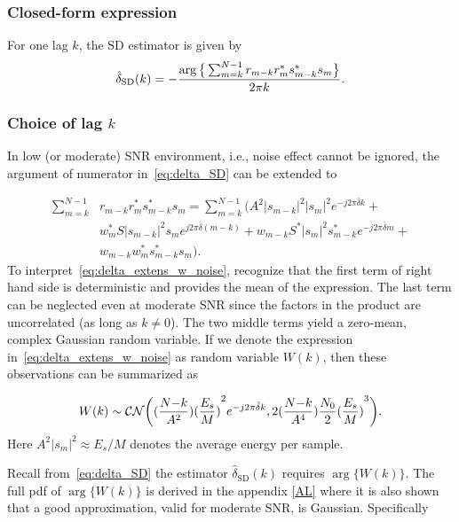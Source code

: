 \subsubsection{Closed-form expression} 
For one lag $k$, the SD estimator is given by
\begin{equation}
    \label{eq:delta_SD}
    \hat{\delta}_{\text{SD}}(k)=-\frac{\arg\big\{\sum_{m=k}^{N-1}r_{m-k}r_m^*s_{m-k}^*s_m\big\}}{2\pi k}.
\end{equation}

\subsubsection{Choice of lag $k$}
In low (or moderate) SNR environment, i.e., noise effect cannot be ignored, the argument of numerator in~\eqref{eq:delta_SD} can be extended to 

\begin{equation}
    \label{eq:delta_extens_w_noise}
    \begin{aligned}
      \sum_{m=k}^{N-1}&r_{m-k}r_m^*s_{m-k}^*s_m= \sum_{m=k}^{N-1} \Big( A^2|s_{m-k}|^2|s_m|^2e^{-j2\pi \bar{\delta} k} + \\
      &w_m^* S|s_{m-k}|^2s_m e^{j2\pi \bar{\delta}(m-k)} + w_{m-k}S^*|s_m|^2s_{m-k}^* e^{-j2\pi \bar{\delta} m} + \\
      &w_{m-k}w_m^*s_{m-k}^*s_m \Big) .
    \end{aligned}
    \end{equation}
To interpret~\eqref{eq:delta_extens_w_noise}, recognize that the first term of right hand side is
deterministic and provides the mean of the expression.
The last term can be neglected even at moderate SNR since the
factors in the product are uncorrelated (as long as $k \neq 0$).
The two middle terms yield a zero-mean, complex Gaussian random variable.
If we denote the expression in~\eqref{eq:delta_extens_w_noise} as random variable $W(k)$,
then these observations can be summarized as

\begin{equation}
    \label{eq:ori_pdf_W}
    W(k) \sim \mathcal{CN}\bigg((
    \frac{N{-}k}{A^2}){(\frac{E_s}{M})}^2e^{-j2\pi \bar{\delta} k},
    2(\frac{N{-}k}{A^4})\frac{N_0}{2}{(\frac{E_s}{M})}^3\bigg).
  \end{equation}
Here $A^2|s_m|^2 {\approx} E_s/M$ denotes the average energy per
sample.

Recall from~\eqref{eq:delta_SD} the estimator $\hat{\delta}_{\text{SD}}(k)$ requires $\arg\{W(k)\}$.
The full pdf of $\arg\{W(k)\}$ is derived in the appendix \ref{AL}
where it is also shown that a good approximation, valid for moderate SNR, 
is Gaussian. Specifically 

